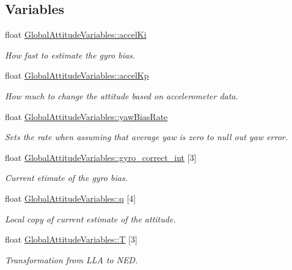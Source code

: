 \subsection*{Variables}
\begin{DoxyCompactItemize}
\item 
float \hyperlink{group___state_ga0a9a06d18d9d208192de6edeed98fbe8}{Global\-Attitude\-Variables\-::accel\-Ki}
\begin{DoxyCompactList}\small\item\em How fast to estimate the gyro bias. \end{DoxyCompactList}\item 
float \hyperlink{group___state_gaf9246ddec8582b6b47b752019c29b2e4}{Global\-Attitude\-Variables\-::accel\-Kp}
\begin{DoxyCompactList}\small\item\em How much to change the attitude based on accelerometer data. \end{DoxyCompactList}\item 
float \hyperlink{group___state_ga0c53c008608a5724b2d563fd5b560905}{Global\-Attitude\-Variables\-::yaw\-Bias\-Rate}
\begin{DoxyCompactList}\small\item\em Sets the rate when assuming that average yaw is zero to null out yaw error. \end{DoxyCompactList}\item 
float \hyperlink{group___state_gac754011cf55a0c78cb770e48567802ba}{Global\-Attitude\-Variables\-::gyro\-\_\-correct\-\_\-int} \mbox{[}3\mbox{]}
\begin{DoxyCompactList}\small\item\em Current etimate of the gyro bias. \end{DoxyCompactList}\item 
float \hyperlink{group___state_ga34a6662a3aea49780925afa629a917cf}{Global\-Attitude\-Variables\-::q} \mbox{[}4\mbox{]}
\begin{DoxyCompactList}\small\item\em Local copy of current estimate of the attitude. \end{DoxyCompactList}\item 
float \hyperlink{group___state_ga45b3fda0427f0fab27b88df83ae9108d}{Global\-Attitude\-Variables\-::\-T} \mbox{[}3\mbox{]}
\begin{DoxyCompactList}\small\item\em Transformation from L\-L\-A to N\-E\-D. \end{DoxyCompactList}\item 

\end{DoxyCompactItemize}
